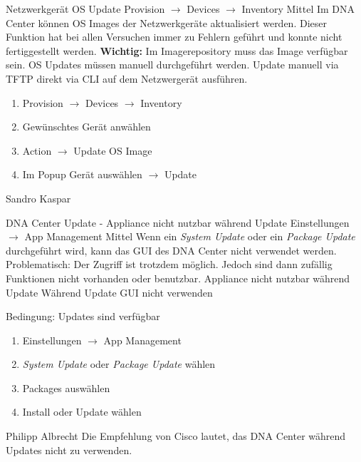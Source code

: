 \bugreport
{Netzwerkgerät OS Update}
{Provision $\rightarrow$ Devices $\rightarrow$ Inventory}
{Mittel}
{Im DNA Center können OS Images der Netzwerkgeräte aktualisiert werden. Dieser Funktion hat bei allen Versuchen immer zu Fehlern geführt und konnte nicht fertiggestellt werden.
\textbf{Wichtig:}
Im Imagerepository muss das Image verfügbar sein. }
{OS Updates müssen manuell durchgeführt werden.}
{Update manuell via TFTP direkt via CLI auf dem Netzwergerät ausführen.}
{
	\begin{enumerate}
		\item Provision $\rightarrow$ Devices $\rightarrow$ Inventory
		\item Gewünschtes Gerät anwählen 
		\item Action $\rightarrow$ Update OS Image
		\item Im Popup Gerät auswählen $\rightarrow$ Update
	\end{enumerate}
}
{Sandro Kaspar}
{}

\bugreport
{DNA Center Update - Appliance nicht nutzbar während Update}
{Einstellungen $\rightarrow$ App Management}
{Mittel}
{Wenn ein \textit{System Update} oder ein \textit{Package Update} durchgeführt wird, kann das GUI des DNA Center nicht verwendet werden. Problematisch: Der Zugriff ist trotzdem möglich. Jedoch sind dann zufällig Funktionen nicht vorhanden oder benutzbar.}
{Appliance nicht nutzbar während Update}
{Während Update GUI nicht verwenden}
{
	Bedingung: Updates sind verfügbar
	\begin{enumerate}
		\item Einstellungen $\rightarrow$ App Management
		\item \textit{System Update} oder \textit{Package Update} wählen
		\item Packages auswählen
		\item Install oder Update wählen
	\end{enumerate}
}
{Philipp Albrecht}
{Die Empfehlung von Cisco lautet, das DNA Center während Updates nicht zu verwenden.}


